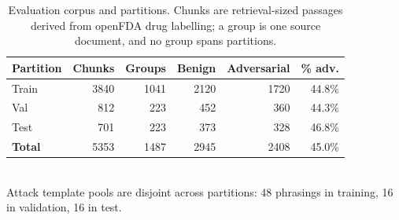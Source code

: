 \begin{table}[htbp]
\centering
\caption{Evaluation corpus and partitions. Chunks are retrieval-sized passages derived from openFDA drug labelling; a group is one source document, and no group spans partitions.}
\label{tab:dataset}
\begin{tabular}{lrrrrr}
\hline
Partition & Chunks & Groups & Benign & Adversarial & \% adv. \\
\hline
Train & 3840 & 1041 & 2120 & 1720 & 44.8\% \\
Val & 812 & 223 & 452 & 360 & 44.3\% \\
Test & 701 & 223 & 373 & 328 & 46.8\% \\
\textbf{Total} & 5353 & 1487 & 2945 & 2408 & 45.0\% \\
\hline
\end{tabular}
\\[2pt]\footnotesize{Attack template pools are disjoint across partitions: 48 phrasings in training, 16 in validation, 16 in test.}
\end{table}
